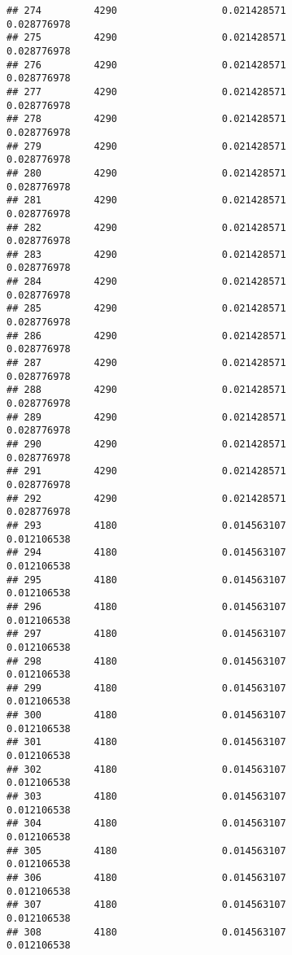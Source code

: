 \documentclass[]{article}
\begin{document}
\begin{verbatim}
## 274         4290                  0.021428571                0.028776978
## 275         4290                  0.021428571                0.028776978
## 276         4290                  0.021428571                0.028776978
## 277         4290                  0.021428571                0.028776978
## 278         4290                  0.021428571                0.028776978
## 279         4290                  0.021428571                0.028776978
## 280         4290                  0.021428571                0.028776978
## 281         4290                  0.021428571                0.028776978
## 282         4290                  0.021428571                0.028776978
## 283         4290                  0.021428571                0.028776978
## 284         4290                  0.021428571                0.028776978
## 285         4290                  0.021428571                0.028776978
## 286         4290                  0.021428571                0.028776978
## 287         4290                  0.021428571                0.028776978
## 288         4290                  0.021428571                0.028776978
## 289         4290                  0.021428571                0.028776978
## 290         4290                  0.021428571                0.028776978
## 291         4290                  0.021428571                0.028776978
## 292         4290                  0.021428571                0.028776978
## 293         4180                  0.014563107                0.012106538
## 294         4180                  0.014563107                0.012106538
## 295         4180                  0.014563107                0.012106538
## 296         4180                  0.014563107                0.012106538
## 297         4180                  0.014563107                0.012106538
## 298         4180                  0.014563107                0.012106538
## 299         4180                  0.014563107                0.012106538
## 300         4180                  0.014563107                0.012106538
## 301         4180                  0.014563107                0.012106538
## 302         4180                  0.014563107                0.012106538
## 303         4180                  0.014563107                0.012106538
## 304         4180                  0.014563107                0.012106538
## 305         4180                  0.014563107                0.012106538
## 306         4180                  0.014563107                0.012106538
## 307         4180                  0.014563107                0.012106538
## 308         4180                  0.014563107                0.012106538

\end{verbatim}
\end{document}

